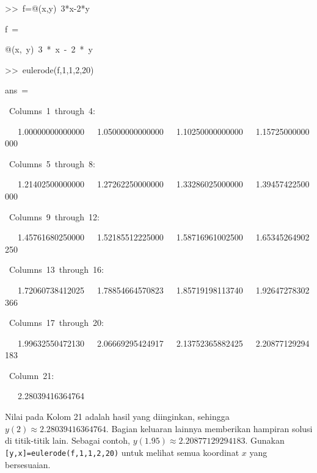 \begin{description}
\begin{lyxcode}
>\textcompwordmark >~f=@(x,y)~3{*}x-2{*}y

f~=

@(x,~y)~3~{*}~x~-~2~{*}~y

>\textcompwordmark >~eulerode(f,1,1,2,20)

ans~=

~Columns~1~through~4:

~~~1.00000000000000~~~1.05000000000000~~~1.10250000000000~~~1.15725000000000

~Columns~5~through~8:

~~~1.21402500000000~~~1.27262250000000~~~1.33286025000000~~~1.39457422500000

~Columns~9~through~12:

~~~1.45761680250000~~~1.52185512225000~~~1.58716961002500~~~1.65345264902250

~Columns~13~through~16:

~~~1.72060738412025~~~1.78854664570823~~~1.85719198113740~~~1.92647278302366

~Columns~17~through~20:

~~~1.99632550472130~~~2.06669295424917~~~2.13752365882425~~~2.20877129294183

~Column~21:

~~~2.28039416364764
\end{lyxcode}
\end{description}
Nilai pada Kolom 21 adalah hasil yang diinginkan, sehingga $y(2)\approx2.28039416364764$.
Bagian keluaran lainnya memberikan hampiran solusi di titik-titik
lain. Sebagai contoh, $y(1.95)\approx2.20877129294183$. Gunakan \texttt{{[}y,x{]}=eulerode(f,1,1,2,20)}
untuk melihat semua koordinat $x$ yang bersesuaian.
